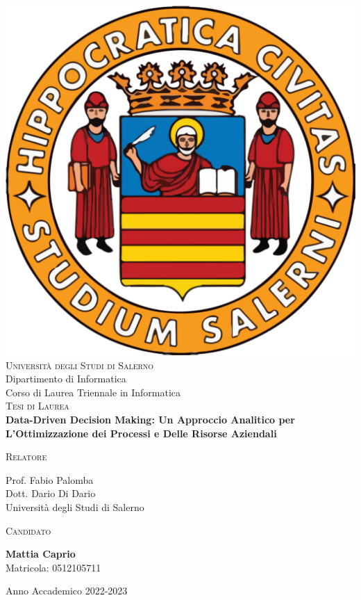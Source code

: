 \begin{titlepage}
\changepage{}{}{}{-7.5 mm}{}{}{}{}{}


\begin{center}
\vspace{0.5cm}
\includegraphics [width=.15\columnwidth, angle=0]{covermatter/figure/logo-unisa}\\ %
{\Large \scshape Università degli Studi di Salerno}\\
\vspace{0.5cm}
{\Large Dipartimento di Informatica}\\
\vspace{0.5cm}
{\Large Corso di Laurea Triennale in Informatica}\\
\vspace{1.5cm}
{\Large \scshape Tesi di Laurea} \\
\vspace{3cm}
{\Huge \bfseries Data-Driven Decision Making: Un Approccio Analitico per L'Ottimizzazione dei Processi e Delle Risorse Aziendali} \\
\vspace{3cm}

\begin{minipage}[t]{7cm}
\flushleft
{\large \textsc{Relatore}}

{\large Prof. Fabio Palomba} \\
{\large Dott. Dario Di Dario} \\
Università degli Studi di Salerno \\[0.25cm]
\end{minipage}
\hfill
\begin{minipage}[t]{7cm}
\flushright
{\large \textsc{Candidato}}

{\large \textbf{Mattia Caprio}} \\
Matricola: 0512105711
\end{minipage}

\vspace{3cm}

{\small Anno Accademico 2022-2023} %
%
%
\end{center}

\end{titlepage}
